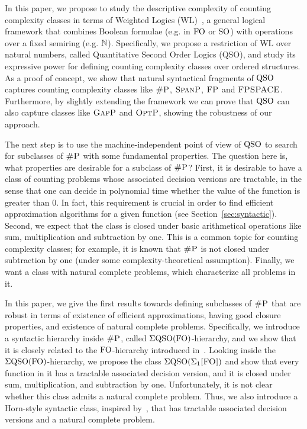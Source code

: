 In this paper, we propose to study the descriptive complexity of counting complexity classes in terms of Weighted Logics (WL)~\cite{DrosteG07}, a general logical framework that combines Boolean formulae (e.g. in ${\rm FO}$ or ${\rm SO}$) with operations over a fixed semiring (e.g. $\mathbb{N}$). 
Specifically, we propose a restriction of WL over natural numbers, called Quantitative Second Order Logics (QSO), and study its expressive power for defining counting complexity classes over ordered structures. 
As a proof of concept, we show that natural syntactical fragments of ${\rm QSO}$ captures counting complexity classes like $\text{\sc \#P}$, $\text{\sc SpanP}$, $\text{\sc FP}$ and $\text{\sc FPSPACE}$.
Furthermore, by slightly extending the framework we can prove that ${\rm QSO}$ can also capture classes like $\text{\sc GapP}$ and $\text{\sc OptP}$, showing the robustness of our approach.

The next step is to use the machine-independent point of view of ${\rm QSO}$ to search for subclasses of $\text{\sc \#P}$ with some fundamental properties.
The question here is, what properties are desirable for a subclass of $\text{\sc \#P}$?
First, it is desirable to have a class of counting problems whose associated decision versions are tractable, in the sense that one can decide in 
polynomial time whether the value of the function is greater than $0$. 
In fact, this requirement is crucial in order to find
efficient approximation algorithms for a given function (see Section~\ref{sec:syntactic}).
Second, we expect that the class is closed under basic arithmetical operations like sum, multiplication and subtraction by one. 
This is a common topic for counting complexity classes; for example, it is known that $\text{\sc \#P}$ is not closed under subtraction by one (under some complexity-theoretical assumption). 
Finally, we want a class with natural complete problems, which characterize all problems in it.

In this paper, we give the first results towards defining subclasses of $\text{\sc \#P}$ that are robust in terms of existence of efficient approximations, having good closure properties, and existence of natural complete problems. 
Specifically, we introduce a syntactic hierarchy inside $\text{\sc \#P}$, called $\Sigma{\rm QSO}({\rm FO})$-hierarchy, and we show that it is closely related to the ${\rm FO}$-hierarchy introduced in~\cite{SalujaST95}. 
Looking inside the $\Sigma{\rm QSO}({\rm FO})$-hierarchy, we propose the class $\Sigma{\rm QSO}(\Sigma_{1}\textsc{[FO]})$ and show that every function in it has a tractable associated decision version, and it is closed under sum, multiplication, and subtraction by one.
Unfortunately, it is not clear whether this class admits 
a natural complete problem.
Thus, 
we also introduce a Horn-style syntactic class, inspired by~\cite{G92},
that has tractable associated decision versions and a natural complete problem.

